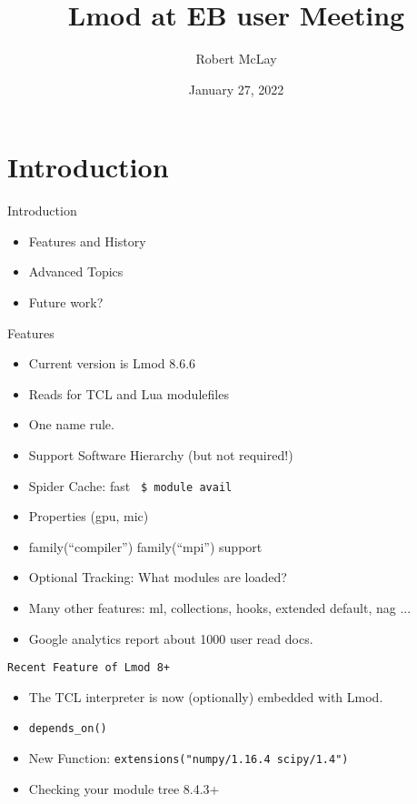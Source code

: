 \documentclass{beamer}
\begin{document}
\title[Lmod]{Lmod at EB user Meeting}
\author{Robert McLay} 
\date{January 27, 2022}

\frame{\titlepage} 

\section{Introduction}

\begin{frame}{Introduction}
  \begin{itemize}
    \item Features and History
    \item Advanced Topics
    \item Future work?
  \end{itemize}
\end{frame}

\begin{frame}{Features}
  \begin{itemize}
    \item Current version is Lmod 8.6.6
    \item Reads for TCL and Lua modulefiles
    \item One name rule.
    \item Support Software Hierarchy (but not required!)
    \item Spider Cache: fast \texttt{\color{blue} \$ module avail}
    \item Properties (gpu, mic)
    \item family(``compiler'') family(``mpi'') support
    \item Optional Tracking: What modules are loaded?
    \item Many other features: ml, collections, hooks,
      extended default, nag ...
    \item Google analytics report about 1000 user read docs.
  \end{itemize}
\end{frame}

\begin{frame}{\texttt{Recent Feature of Lmod 8+}}
  \begin{itemize}
    \item The TCL interpreter is now (optionally) embedded with Lmod.
    \item \texttt{depends\_on()}
    \item New Function: \texttt{extensions("numpy/1.16.4 scipy/1.4")}
    \item Checking your module tree 8.4.3+
  \end{itemize}
\end{frame}
\end{document}
